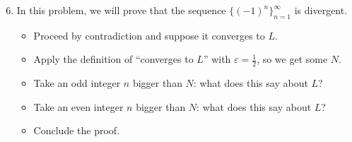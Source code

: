 \documentclass[12pt]{amsart}
\newcommand{\e}{\varepsilon}
\begin{document}
\begin{enumerate}\setcounter{enumi}{5}
\item In this problem, we will prove that the sequence $\{ (-1)^{n} \}_{n=1}^\infty$ is divergent.

\begin{itemize}
\item Proceed by contradiction and suppose it converges to $L$.
\item Apply the definition of ``converges to $L$'' with $\e = \frac{1}{2}$, so we get some $N$.
\item Take an odd integer $n$ bigger than $N$: what does this say about $L$?
\item  Take an even integer $n$ bigger than $N$: what does this say about $L$?
\item Conclude the proof.
\end{itemize}
\end{enumerate}
\end{document}
